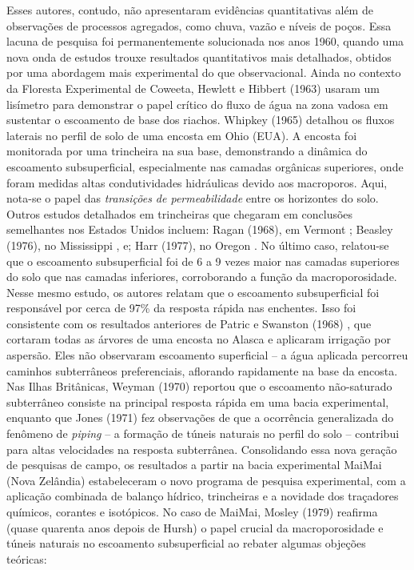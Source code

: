 \documentclass[./main.tex]{subfiles}
\begin{document}
\par Esses autores, contudo, não apresentaram evidências quantitativas além de observações de processos agregados, como chuva, vazão e níveis de poços. Essa lacuna de pesquisa foi permanentemente solucionada nos anos 1960, quando uma nova onda de estudos trouxe resultados quantitativos mais detalhados, obtidos por uma abordagem mais experimental do que observacional. Ainda no contexto da Floresta Experimental de Coweeta, Hewlett e Hibbert (1963) \cite{Hewlett1963} usaram um lisímetro para demonstrar o papel crítico do fluxo de água na zona vadosa em sustentar o escoamento de base dos riachos. Whipkey (1965) \cite{Whipkey1965} detalhou os fluxos laterais no perfil de solo de uma encosta em Ohio (EUA). A encosta foi monitorada por uma trincheira na sua base, demonstrando a dinâmica do escoamento subsuperficial, especialmente nas camadas orgânicas superiores, onde foram medidas altas condutividades hidráulicas devido aos macroporos. Aqui, nota-se o papel das \textit{transições de permeabilidade} entre os horizontes do solo. Outros estudos detalhados em trincheiras que chegaram em conclusões semelhantes nos Estados Unidos incluem: Ragan (1968), em Vermont \cite{Ragan1968}; Beasley (1976), no Mississippi \cite{Beasley1976}, e; Harr (1977), no Oregon \cite{Harr1977}. No último caso, relatou-se que o escoamento subsuperficial foi de 6 a 9 vezes maior nas camadas superiores do solo que nas camadas inferiores, corroborando a função da macroporosidade. Nesse mesmo estudo, os autores relatam que o escoamento subsuperficial foi responsável por cerca de 97\% da resposta rápida nas enchentes. Isso foi consistente com os resultados anteriores de Patric e Swanston (1968) \cite{patric1968}, que cortaram todas as árvores de uma encosta no Alasca e aplicaram irrigação por aspersão. Eles não observaram escoamento superficial -- a água aplicada percorreu caminhos subterrâneos preferenciais, aflorando rapidamente na base da encosta. Nas Ilhas Britânicas, Weyman (1970) \cite{weyman1970} reportou que o escoamento não-saturado subterrâneo consiste na principal resposta rápida em uma bacia experimental, enquanto que Jones (1971) \cite{Jones1971} fez observações de que a ocorrência generalizada do fenômeno de \textit{piping} -- a formação de túneis naturais no perfil do solo -- contribui para altas velocidades na resposta subterrânea. Consolidando essa nova geração de pesquisas de campo, os resultados a partir na bacia experimental MaiMai (Nova Zelândia) estabeleceram o novo programa de pesquisa experimental, com a aplicação combinada de balanço hídrico, trincheiras e a novidade dos traçadores químicos, corantes e isotópicos. No caso de MaiMai, Mosley (1979) \cite{Mosley1979} reafirma (quase quarenta anos depois de Hursh) o papel crucial da macroporosidade e túneis naturais no escoamento subsuperficial ao rebater algumas objeções teóricas:
\end{document}
